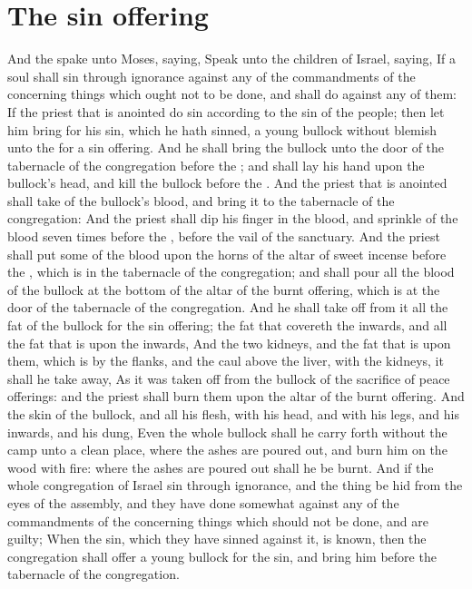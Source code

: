 \section*{The sin offering}
\begin{biblechapter} %
\verse And the \LORD spake unto Moses, saying,
\verse Speak unto the children of Israel, saying, If a soul shall sin through ignorance against any of the commandments of the \LORD concerning things which ought not to be done, and shall do against any of them:
\verse If the priest that is anointed do sin according to the sin of the people; then let him bring for his sin, which he hath sinned, a young bullock without blemish unto the \LORD for a sin offering.
\verse And he shall bring the bullock unto the door of the tabernacle of the congregation before the \LORD; and shall lay his hand upon the bullock's head, and kill the bullock before the \LORD.
\verse And the priest that is anointed shall take of the bullock's blood, and bring it to the tabernacle of the congregation:
\verse And the priest shall dip his finger in the blood, and sprinkle of the blood seven times before the \LORD, before the vail of the sanctuary.
\verse And the priest shall put some of the blood upon the horns of the altar of sweet incense before the \LORD, which is in the tabernacle of the congregation; and shall pour all the blood of the bullock at the bottom of the altar of the burnt offering, which is at the door of the tabernacle of the congregation.
\verse And he shall take off from it all the fat of the bullock for the sin offering; the fat that covereth the inwards, and all the fat that is upon the inwards,
\verse And the two kidneys, and the fat that is upon them, which is by the flanks, and the caul above the liver, with the kidneys, it shall he take away,
\verse As it was taken off from the bullock of the sacrifice of peace offerings: and the priest shall burn them upon the altar of the burnt offering.
\verse And the skin of the bullock, and all his flesh, with his head, and with his legs, and his inwards, and his dung,
\verse Even the whole bullock shall he carry forth without the camp unto a clean place, where the ashes are poured out, and burn him on the wood with fire: where the ashes are poured out shall he be burnt.
\verse And if the whole congregation of Israel sin through ignorance, and the thing be hid from the eyes of the assembly, and they have done somewhat against any of the commandments of the \LORD concerning things which should not be done, and are guilty;
\verse When the sin, which they have sinned against it, is known, then the congregation shall offer a young bullock for the sin, and bring him before the tabernacle of the congregation.

\end{biblechapter}
